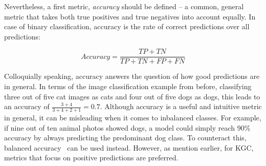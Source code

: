Nevertheless, a first metric, \emph{accuracy} should be defined -- a common, general metric that takes both true positives and true negatives into account equally. In case of binary classification, accuracy is the rate of correct predictions over all predictions:

\[
    Accuracy = \frac{TP + TN}{TP + TN + FP + FN}
\]

Colloquially speaking, accuracy answers the question of how good predictions are in general. In terms of the image classification example from before, classifying three out of five cat images as cats and four out of five dogs as dogs, this leads to an accuracy of $\frac{3 + 4}{3 + 4 + 2 + 1} = 0.7$. Although accuracy is a useful and intuitive metric in general, it can be misleading when it comes to inbalanced classes. For example, if nine out of ten animal photos showed dogs, a model could simply reach 90\% accuracy by always predicting the predominant dog class. To counteract this, balanced accuracy~\cite{Mower2005PREPMtPR} can be used instead. However, as mention earlier, for KGC, metrics that focus on positive predictions are preferred.
